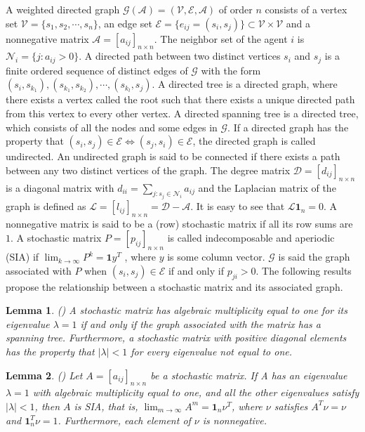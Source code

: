 \documentclass[12pt,draftcls,onecolumn]{IEEEtran}
\newtheorem{lemma}{Lemma}
\begin{document}
A weighted directed graph $\mathscr{G}(\mathscr{A})=(\mathscr{V},\mathscr{E},\mathscr{A})$ of order $n$
consists of a vertex set $\mathscr{V}=\{s_{1}, s_{2}, \cdots, s_{n}\}$,  an edge set
$\mathscr{E}=\{e_{ij}=(s_{i}, s_{j})\}\subset \mathscr{V}\times \mathscr{V}$ and a nonnegative
matrix $\mathscr{A}=[a_{ij}]_{n\times n}$. The neighbor set of the agent $i$ is
$\mathscr{N}_i=\{j: a_{ij}>0\}$. A directed path between two distinct vertices $s_{i}$ and $s_{j}$ is
a finite ordered sequence of distinct edges of $\mathscr{G}$ with the form $(s_{i}, s_{k_{1}}), (s_{k_{1}}, s_{k_{2}}), \cdots, (s_{k_{l}}, s_{j})$.
A directed tree is a directed graph, where there exists a vertex called the root such that there exists a unique directed path from this vertex to every other vertex. A directed spanning tree is a directed tree, which consists of all the nodes and some edges in $\mathscr{G}$.
If a directed graph has the property that $(s_{i}, s_{j})\in \mathscr{E} \Leftrightarrow (s_{j}, s_{i})\in \mathscr{E}$, the directed graph is called undirected. An undirected graph is said to be connected if there exists a path between any two distinct vertices of the graph. The degree matrix
$\mathscr{D}=[d_{ij}]_{n\times n}$ is a diagonal matrix with $d_{ii}=\sum_{j:s_j\in \mathscr{N}_{i}} a_{ij}$ and
the Laplacian matrix of the graph is defined as $\mathscr{L}=[l_{ij}]_{n \times n}=\mathscr{D}-\mathscr{A}.$
It is easy to see that $\mathscr{L}\mathbf{1}_{n}=0$. 
A nonnegative matrix is said to be a (row) stochastic matrix if all its row sums are $1$. A stochastic matrix $P=[p_{ij}]_{n\times n}$ is called indecomposable and aperiodic (SIA) if $\lim_{k\rightarrow\infty} P^k = \mathbf{1}y^T$ , where $y$ is some column vector. $\mathscr{G}$ is said the graph associated with $P$ when $(s_{i}, s_{j})\in \mathscr{E}$ if and only if $p_{ji}>0$. The following results propose the relationship between a stochastic matrix and its associated graph.

\begin{lemma}\label{lemma-renw-3.5}(\cite{ren05})  A stochastic matrix has algebraic multiplicity equal
to one for its eigenvalue $\lambda = 1$ if and only if the graph associated
with the matrix has a spanning tree. Furthermore, a stochastic matrix
with positive diagonal elements has the property that $|\lambda| < 1$ for every
eigenvalue not equal to one.
\end{lemma}

\begin{lemma}\label{lemma-renw-3.7}(\cite{ren05}) Let $A = [a_{ij} ]_{n\times n}$ be a stochastic matrix. If
A has an eigenvalue $\lambda = 1$ with algebraic multiplicity equal to one,
and all the other eigenvalues satisfy $|\lambda| < 1$, then $A$ is SIA, that is,
$\lim_{m\rightarrow \infty} A^m=\mathbf{1}_n\nu^T $, where $\nu$ satisfies $A^T\nu = \nu$ and $\mathbf{1}_n^T \nu= 1$. Furthermore, each element of $\nu$ is nonnegative.
\end{lemma}
\end{document}
